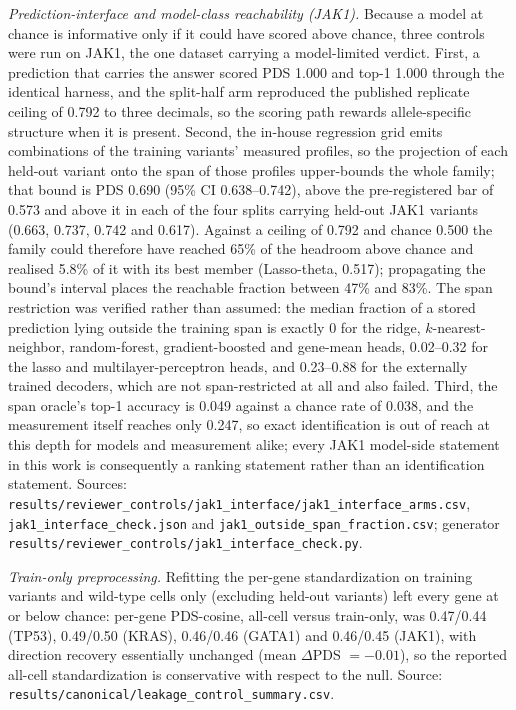 \documentclass[11pt,letterpaper]{article}
\begin{document}
\smallskip
\noindent\textit{Prediction-interface and model-class reachability (JAK1).} Because a model at chance is informative only if it could have scored above chance, three controls were run on JAK1, the one dataset carrying a model-limited verdict. First, a prediction that carries the answer scored PDS 1.000 and top-1 1.000 through the identical harness, and the split-half arm reproduced the published replicate ceiling of 0.792 to three decimals, so the scoring path rewards allele-specific structure when it is present. Second, the in-house regression grid emits combinations of the training variants' measured profiles, so the projection of each held-out variant onto the span of those profiles upper-bounds the whole family; that bound is PDS 0.690 (95\% CI 0.638--0.742), above the pre-registered bar of 0.573 and above it in each of the four splits carrying held-out JAK1 variants (0.663, 0.737, 0.742 and 0.617). Against a ceiling of 0.792 and chance 0.500 the family could therefore have reached 65\% of the headroom above chance and realised 5.8\% of it with its best member (Lasso-theta, 0.517); propagating the bound's interval places the reachable fraction between 47\% and 83\%. The span restriction was verified rather than assumed: the median fraction of a stored prediction lying outside the training span is exactly 0 for the ridge, $k$-nearest-neighbor, random-forest, gradient-boosted and gene-mean heads, 0.02--0.32 for the lasso and multilayer-perceptron heads, and 0.23--0.88 for the externally trained decoders, which are not span-restricted at all and also failed. Third, the span oracle's top-1 accuracy is 0.049 against a chance rate of 0.038, and the measurement itself reaches only 0.247, so exact identification is out of reach at this depth for models and measurement alike; every JAK1 model-side statement in this work is consequently a ranking statement rather than an identification statement. Sources: \texttt{results/reviewer\_controls/jak1\_interface/jak1\_interface\_arms.csv}, \texttt{jak1\_interface\_check.json} and \texttt{jak1\_outside\_span\_fraction.csv}; generator \texttt{results/reviewer\_controls/jak1\_interface\_check.py}.

\smallskip
\noindent\textit{Train-only preprocessing.} Refitting the per-gene standardization on training variants and wild-type cells only (excluding held-out variants) left every gene at or below chance: per-gene PDS-cosine, all-cell versus train-only, was 0.47/0.44 (TP53), 0.49/0.50 (KRAS), 0.46/0.46 (GATA1) and 0.46/0.45 (JAK1), with direction recovery essentially unchanged (mean $\Delta$PDS $=-0.01$), so the reported all-cell standardization is conservative with respect to the null. Source: \texttt{results/canonical/leakage\_control\_summary.csv}.
\end{document}
